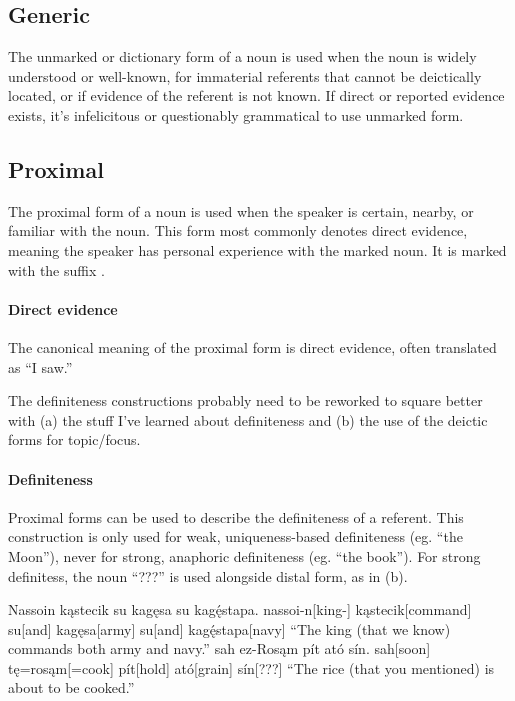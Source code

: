 \subsection{Generic}
The unmarked or dictionary form of a noun is used when the noun is widely understood or well-known, for immaterial referents that cannot be deictically located, or if evidence of the referent is not known. If direct or reported evidence exists, it's infelicitous or questionably grammatical to use unmarked form.

\subsection{Proximal}
The proximal form of a noun is used when the speaker is certain, nearby, or familiar with the noun.
This form most commonly denotes direct evidence, meaning the speaker has personal experience with the marked noun. It is marked with the suffix . 

\paragraph{Direct evidence}
The canonical meaning of the proximal form is direct evidence, often translated as “I saw.” 

\begin{kaobox}[frametitle=\sc todo:]
    The definiteness constructions probably need to be reworked to square better with (a) the stuff I've learned about definiteness and (b) the use of the deictic forms for topic/focus.
\end{kaobox}

\paragraph{Definiteness}
Proximal forms can be used to describe the definiteness of a referent. This construction is only used for weak, uniqueness-based definiteness (eg. “the Moon”), never for strong, anaphoric definiteness (eg. “the book”). For strong definitess, the noun  “???” is used alongside distal form, as in (\nextx b).

\begin{gloss*}
    \a \begingl
        \glpreamble Nassoin kąstecik su kagęsa su kagę́stapa. \endpreamble
            nassoi-n[king-]
            kąstecik[command]
            su[and]
            kagęsa[army]
            su[and]
            kagę́stapa[navy]
        \glft “The king (that we know) commands both army and navy.”
    \endgl
    \a \begingl
        \glpreamble sah ez-Rosąm pít ató sín. \endpreamble
            sah[soon]
            tę=rosąm[=cook]
            pít[hold\tbs{}]
            ató[grain\tbs{}]
            sín[???\tbs{}]
        \glft “The rice (that you mentioned) is about to be cooked.”
    \endgl
\end{gloss*}


